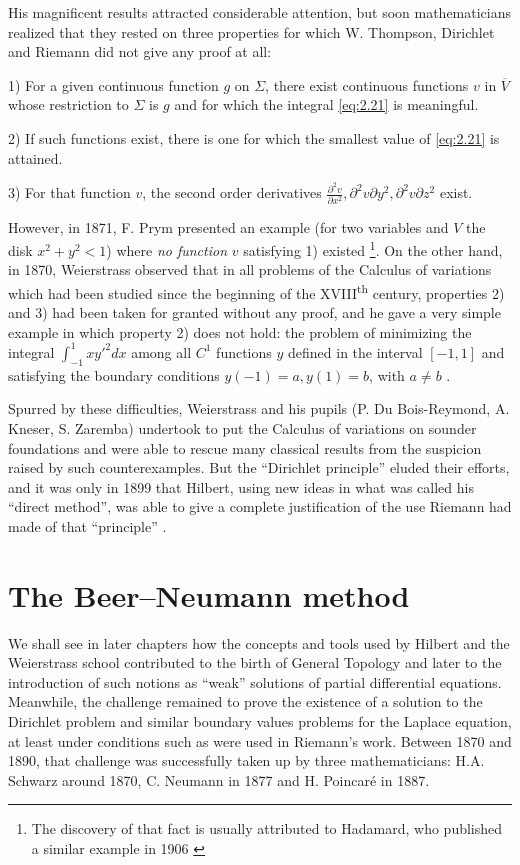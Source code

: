 \documentclass[12pt,a4paper,leqno,twoside]{extbook}
\newcommand{\supth}{\texorpdfstring{\textsuperscript{th}}{th}}
\begin{document}
His magnificent results attracted considerable attention, but soon mathematicians realized that they rested on three properties for which W. Thompson, Dirichlet and Riemann did not give any proof at all:

1) For a given continuous function \(g\) on \(\Sigma\), there exist continuous functions \(v\) in \(\overline{V}\) whose restriction to \(\Sigma\) is \(g\) and for which the integral \eqref{eq:2.21} is meaningful.

2) If such functions exist, there is one for which the smallest value of \eqref{eq:2.21} is attained.

3) For that function \(v\), the second order derivatives \(\frac{\partial^2 v}{\partial x^2}, {\partial^2 v}{\partial y^2}, {\partial^2 v}{\partial z^2}\) exist.

However, in 1871, F. Prym presented an example (for two variables and \(V\) the disk \(x^2 + y^2 < 1\)) where \emph{no function} \(v\) satisfying 1) existed \cite{181}\footnote{The discovery of that fact is usually attributed to Hadamard, who published a similar example in 1906 \cite[vol.~III, p.~1245--1248]{094}}. On the other hand, in 1870, Weierstrass observed that in all problems of the Calculus of variations which had been studied since the beginning of the XVIII\supth{} century, properties 2) and 3) had been taken for granted without any proof, and he gave a very simple example in which property 2) does not hold: the problem of minimizing the integral \(\int_{-1}^1 xy'^2dx\) among all \(C^1\) functions \(y\) defined in the interval \([-1, 1]\) and satisfying the boundary conditions \(y(-1) = a, y(1) = b\), with \(a \neq b\) \cite[p.~390--391]{S}.

Spurred by these difficulties, Weierstrass and his pupils (P. Du Bois-Reymond, A. Kneser, S. Zaremba) undertook to put the Calculus of variations on sounder foundations and were able to rescue many classical results from the suspicion raised by such counterexamples. But the ``Dirichlet principle'' eluded their efforts, and it was only in 1899 that Hilbert, using new ideas in what was called his ``direct method'', was able to give a complete justification of the use Riemann had made of that ``principle'' \cite[vol.~III, p.~10--37]{111}.

\section{The Beer--Neumann method}
\label{sec:2.5}

We shall see in later chapters how the concepts and tools used by Hilbert and the Weierstrass school contributed to the birth of General Topology and later to the introduction of such notions as ``weak'' solutions of partial differential equations. Meanwhile, the challenge remained to prove the existence of a solution to the Dirichlet problem and similar boundary values problems for the Laplace equation, at least under conditions such as were used in Riemann's work. Between 1870 and 1890, that challenge was successfully taken up by three mathematicians: H.A. Schwarz around 1870, C. Neumann in 1877 and H. Poincaré in 1887.
\end{document}
